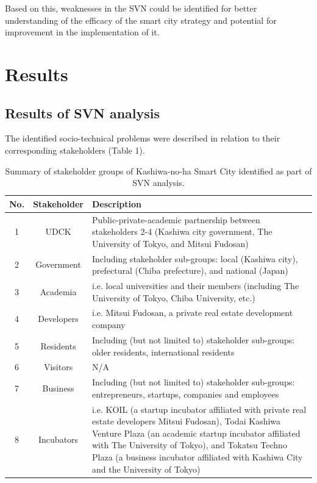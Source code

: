 \documentclass[conference]{IEEEtran}
\begin{document}
Based on this, weaknesses in the SVN could be identified for better understanding of the efficacy of the smart city strategy and potential for improvement in the implementation of it. 



\section{\textbf{Results}}

\subsection{\textbf{Results of SVN analysis}}

The identified socio-technical problems were described in relation to their corresponding stakeholders (Table 1).

\begin{table}[ht!] %
\centering
\caption{Summary of stakeholder groups of Kashiwa-no-ha Smart City identified as part of SVN analysis.}
\begin{tabular}{|c|c|p{2in}|}
 \hline
\bfseries No.&\bfseries  Stakeholder&\bfseries Description\\
 \hline
1& UDCK & Public-private-academic partnership between stakeholders 2-4 (Kashiwa city government, The University of Tokyo, and Mitsui Fudosan) \\
 \hline
2& Government & Including stakeholder sub-groups: local (Kashiwa city), prefectural (Chiba prefecture), and national (Japan) \\
 \hline
3& Academia & i.e. local universities and their members (including The University of Tokyo, Chiba University, etc.) \\
 \hline
4& Developers & i.e. Mitsui Fudosan, a private real estate development company \\
 \hline
5& Residents & Including (but not limited to) stakeholder sub-groups: older residents, international residents \\
 \hline
6& Visitors & N/A \\
 \hline
7& Business & Including (but not limited to) stakeholder sub-groups: entrepreneurs, startups, companies and employees \\
 \hline
8& Incubators & i.e. KOIL (a startup incubator affiliated with private real estate developers Mitsui Fudosan), Todai Kashiwa Venture Plaza (an academic startup incubator affiliated with The University of Tokyo), and Tokatsu Techno Plaza (a business incubator affiliated with Kashiwa City and the University of Tokyo) \\
 \hline
\end{tabular}
\label{TABLE}
\end{table}
\end{document}
